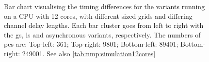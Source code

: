 \begin{figure}
    \caption[Bar chart visualising the timing differences for the variants on a 12-core CPU]{Bar chart visualising the timing differences for the variants running on a CPU with 12 cores, with different sized grids and differing channel delay lengths.  Each bar cluster goes from left to right with the \gls{gs}, \gls{ls} and asynchronous variants, respectively.  The numbers of \glspl{pe} are:  Top-left: 361;  Top-right:  \num{9 801};  Bottom-left:  \num{89 401};  Bottom-right:  \num{249 001}.  See also \cref{tab:nmp:simulation12cores}}
    \label{fig:nmp:timings12cores}
\end{figure}

